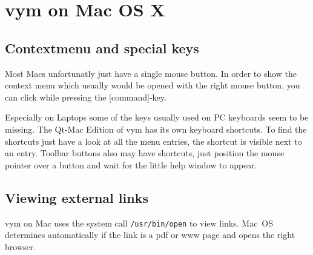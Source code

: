 \documentclass[12pt,a4paper]{article}
\newcommand{\vym}{{\sc vym }}
\newcommand{\key}[1]{[#1]}
\begin{document}
\section{\vym on Mac OS X}

\subsection {Contextmenu and special keys}
Most Macs unfortunatly just have a single mouse button. In order to show
the context menu which usually would be opened with the right mouse
button, you can click while pressing the \key{command}-key.

Especially on Laptops some of the keys usually used on PC keyboards seem
to be missing. The Qt-Mac Edition of \vym has its own keyboard
shortcuts. To find the shortcuts just have a look at all the menu
entries, the shortcut is visible next to an entry. Toolbar buttons also
may have shortcuts, just position the mouse pointer over a button and
wait for the little help window to appear. 

\subsection {Viewing external links}
\vym on Mac uses the system call {\tt /usr/bin/open} to view links.
Mac~OS determines automatically if the link is a pdf or www page and
opens the right browser.

\newpage
\end{document}

